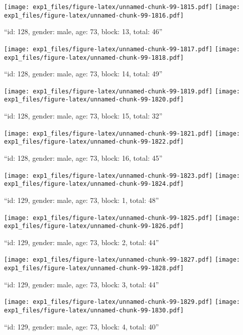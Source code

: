 \documentclass[,]{article}
\begin{document}
\texttt{[image: exp1\_files/figure-latex/unnamed-chunk-99-1815.pdf]}
\texttt{[image: exp1\_files/figure-latex/unnamed-chunk-99-1816.pdf]}

\newpage
[1] 

``id: 128, gender: male, age: 73, block: 13, total: 46''

\texttt{[image: exp1\_files/figure-latex/unnamed-chunk-99-1817.pdf]}
\texttt{[image: exp1\_files/figure-latex/unnamed-chunk-99-1818.pdf]}

\newpage
[1] 

``id: 128, gender: male, age: 73, block: 14, total: 49''

\texttt{[image: exp1\_files/figure-latex/unnamed-chunk-99-1819.pdf]}
\texttt{[image: exp1\_files/figure-latex/unnamed-chunk-99-1820.pdf]}

\newpage
[1] 

``id: 128, gender: male, age: 73, block: 15, total: 32''

\texttt{[image: exp1\_files/figure-latex/unnamed-chunk-99-1821.pdf]}
\texttt{[image: exp1\_files/figure-latex/unnamed-chunk-99-1822.pdf]}

\newpage
[1] 

``id: 128, gender: male, age: 73, block: 16, total: 45''

\texttt{[image: exp1\_files/figure-latex/unnamed-chunk-99-1823.pdf]}
\texttt{[image: exp1\_files/figure-latex/unnamed-chunk-99-1824.pdf]}

\newpage
[1] 

``id: 129, gender: male, age: 73, block: 1, total: 48''

\texttt{[image: exp1\_files/figure-latex/unnamed-chunk-99-1825.pdf]}
\texttt{[image: exp1\_files/figure-latex/unnamed-chunk-99-1826.pdf]}

\newpage
[1] 

``id: 129, gender: male, age: 73, block: 2, total: 44''

\texttt{[image: exp1\_files/figure-latex/unnamed-chunk-99-1827.pdf]}
\texttt{[image: exp1\_files/figure-latex/unnamed-chunk-99-1828.pdf]}

\newpage
[1] 

``id: 129, gender: male, age: 73, block: 3, total: 44''

\texttt{[image: exp1\_files/figure-latex/unnamed-chunk-99-1829.pdf]}
\texttt{[image: exp1\_files/figure-latex/unnamed-chunk-99-1830.pdf]}

\newpage
[1] 

``id: 129, gender: male, age: 73, block: 4, total: 40''
\end{document}
